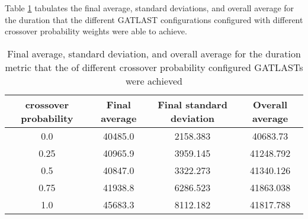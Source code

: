Table \ref{tab:HP:GA:crossoverProp:duration} tabulates the final average, standard deviations, and overall average for the duration that the different GATLAST configurations configured with different crossover probability weights were able to achieve.
\begin{table}[tbh!]
\centering
\begin{adjustbox}{trim=0cm 0cm 0cm 0cm, clip=true}
\begin{tabular}{|c|c|c|c|}
\hline
crossover probability & Final average & Final standard deviation & Overall average\\
\hline
0.0 & 40485.0 & 2158.383 & 40683.73\\\hline
0.25 & 40965.9 & 3959.145 & 41248.792\\\hline
0.5 & 40847.0 & 3322.273 & 41340.126\\\hline
0.75 & 41938.8 & 6286.523 & 41863.038\\\hline
1.0 & 45683.3 & 8112.182 & 41817.788\\\hline
\end{tabular}
\end{adjustbox}
\caption{Final average, standard deviation, and overall average for the duration metric that the of different crossover probability configured GATLASTs were achieved}
\label{tab:HP:GA:crossoverProp:duration}
\end{table}